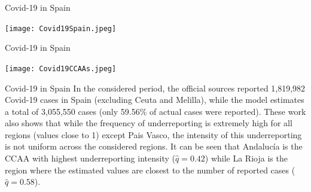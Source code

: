\documentclass[
    10pt,
    aspectratio=169,
    usenames,
    dvipsnames
]{beamer}
\begin{document}
\begin{frame}[fragile]{Covid-19 in Spain}

\centering
\texttt{[image: Covid19Spain.jpeg]}

\end{frame}

\begin{frame}[fragile]{Covid-19 in Spain}

\centering
\texttt{[image: Covid19CCAAs.jpeg]}

\end{frame}

\begin{frame}{Covid-19 in Spain}
In the considered period, the official sources reported 1,819,982 Covid-19 cases in Spain (excluding Ceuta and Melilla), while the model estimates a total of 3,055,550 cases (only 59.56\% of actual cases were reported). These work also shows that while the frequency of underreporting is extremely high for all regions (values close to 1) except Pais Vasco, the intensity of this underreporting is not uniform across the considered regions. It can be seen that Andaluc\'ia is the CCAA with highest underreporting intensity ($\hat{q}=0.42$) while La Rioja is the region where the estimated values are closest to the number of reported cases ($\hat{q}=0.58$).
\end{frame}
\end{document}
